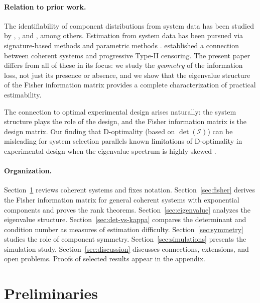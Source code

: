 \documentclass[12pt]{article}
\theoremstyle{definition}
\theoremstyle{remark}
\begin{document}
\paragraph{Relation to prior work.}
The identifiability of component distributions from system data has been
studied by \citet{BasuGhosh1980}, \citet{Meilijson1981}, and
\citet{Nowik1990}, among others.  Estimation from system data has been
pursued via signature-based methods
\citep{BhattacharyaSamaniego2010, NgNavarroBalakrishnan2017,
YangNgBalakrishnan2019, HallJinSamaniego2015} and parametric methods
\citep{LinUsherGuess1993, SarhanElBassiouny2003, BheringPereiraPolpo2014}.
\citet{CramerNavarro2015} established a connection between coherent
systems and progressive Type-II censoring.  The present paper differs
from all of these in its focus: we study the \emph{geometry} of the
information loss, not just its presence or absence, and we show that
the eigenvalue structure of the Fisher information matrix provides a
complete characterization of practical estimability.

The connection to optimal experimental design
\citep{Kiefer1974, Pukelsheim2006} arises naturally: the system
structure plays the role of the design, and the Fisher information
matrix is the design matrix.  Our finding that D-optimality (based on
$\det(\mathcal{I})$) can be misleading for system selection parallels
known limitations of D-optimality in experimental design when the
eigenvalue spectrum is highly skewed \citep{Atkinson2007}.

\paragraph{Organization.}
Section~\ref{sec:prelim} reviews coherent systems and fixes notation.
Section~\ref{sec:fisher} derives the Fisher information matrix for
general coherent systems with exponential components and proves the
rank theorems.
Section~\ref{sec:eigenvalue} analyzes the eigenvalue structure.
Section~\ref{sec:det-vs-kappa} compares the determinant and condition
number as measures of estimation difficulty.
Section~\ref{sec:symmetry} studies the role of component symmetry.
Section~\ref{sec:simulations} presents the simulation study.
Section~\ref{sec:discussion} discusses connections, extensions, and
open problems.
Proofs of selected results appear in the appendix.


\section{Preliminaries}
\label{sec:prelim}
\end{document}
